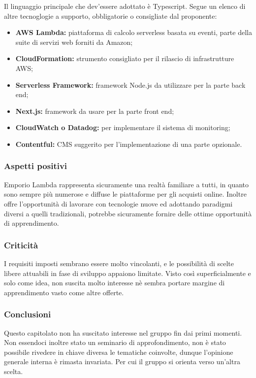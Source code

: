 Il linguaggio principale che dev'essere adottato è Typescript. Segue un elenco di altre tecnoglogie a supporto, obbligatorie o consigliate dal proponente:
\begin{itemize}
    \item \textbf{AWS Lambda:} piattaforma di calcolo serverless basata su eventi, parte della suite di servizi web forniti da Amazon;
    \item \textbf{CloudFormation:} strumento consigliato per il rilascio di infrastrutture AWS;
    \item \textbf{Serverless Framework:} framework Node.js da utilizzare per la parte back end;
    \item \textbf{Next.js:} framework da usare per la parte front end;
    \item \textbf{CloudWatch o Datadog:} per implementare il sistema di monitoring;
    \item \textbf{Contentful:} CMS suggerito per l'implementazione di una parte opzionale.
\end{itemize}


\subsubsection{Aspetti positivi}

Emporio Lambda rappresenta sicuramente una realtà familiare a tutti, in quanto sono sempre più numerose e diffuse le piattaforme per gli acquisti online. Inoltre offre l'opportunità di lavorare con tecnologie nuove ed adottando paradigmi diversi a quelli tradizionali, potrebbe sicuramente fornire delle ottime opportunità di apprendimento.


\subsubsection{Criticità}

I requisiti imposti sembrano essere molto vincolanti, e le possibilità di scelte libere attuabili in fase di sviluppo appaiono limitate. Visto così superficialmente e solo come idea, non suscita molto interesse nè sembra portare margine di apprendimento vasto come altre offerte.


\subsubsection{Conclusioni}

Questo capitolato non ha suscitato interesse nel gruppo fin dai primi momenti. Non essendoci inoltre stato un seminario di approfondimento, non è stato possibile rivedere in chiave diversa le tematiche coinvolte, dunque l'opinione generale interna è rimasta invariata. Per cui il gruppo si orienta verso un'altra scelta.





